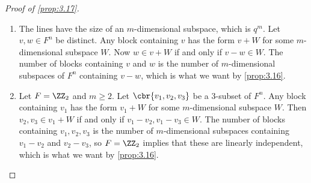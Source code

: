 \begin{proof}[Proof of \ref{prop:3.17}]
\hfill
\begin{enumerate}
\item The lines have the size of an $ m $-dimensional subspace, which is $ q^m $. Let $ v, w \in F^n $ be distinct. Any block containing $ v $ has the form $ v + W $ for some $ m $-dimensional subspace $ W $. Now $ w \in v + W $ if and only if $ v - w \in W $. The number of blocks containing $ v $ and $ w $ is the number of $ m $-dimensional subspaces of $ F^n $ containing $ v - w $, which is what we want by \ref{prop:3.16}.
\item Let $ F = \ZZ_2 $ and $ m \ge 2 $. Let $ \cbr{v_1, v_2, v_3} $ be a $ 3 $-subset of $ F^n $. Any block containing $ v_1 $ has the form $ v_1 + W $ for some $ m $-dimensional subspace $ W $. Then $ v_2, v_3 \in v_1 + W $ if and only if $ v_1 - v_2, v_1 - v_3 \in W $. The number of blocks containing $ v_1, v_2, v_3 $ is the number of $ m $-dimensional subspaces containing $ v_1 - v_2 $ and $ v_2 - v_3 $, so $ F = \ZZ_2 $ implies that these are linearly independent, which is what we want by \ref{prop:3.16}.
\end{enumerate}
\end{proof}

